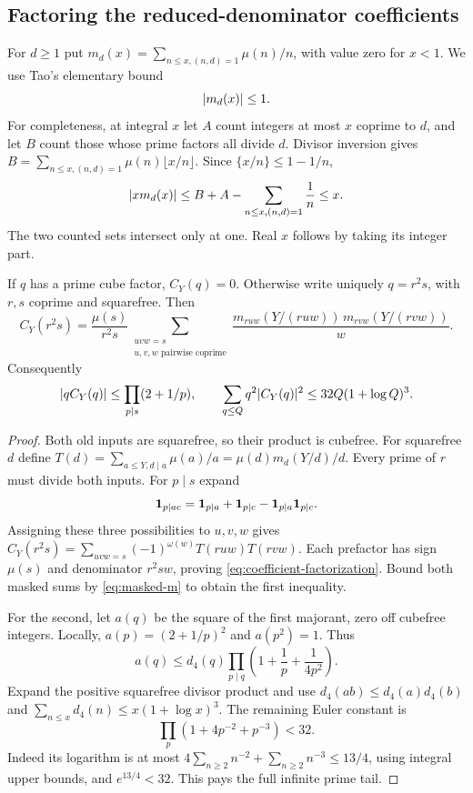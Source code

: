 \subsection{Factoring the reduced-denominator coefficients}
For $d\ge1$ put $m_d(x)=\sum_{n\le x,(n,d)=1}\mu(n)/n$, with value zero for $x<1$. We use Tao's elementary bound \cite{Tao10}
\begin{equation}\label{eq:masked-m}
 \lvert m_d(x)\rvert\le1.
\end{equation}
For completeness, at integral $x$ let $A$ count integers at most $x$ coprime to $d$, and let $B$ count those whose prime factors all divide $d$. Divisor inversion gives
$B=\sum_{n\le x,(n,d)=1}\mu(n)\lfloor x/n\rfloor$. Since $\{x/n\}\le1-1/n$,
\[
 \lvert xm_d(x)\rvert\le B+A-\sum_{n\le x,(n,d)=1}\frac1n\le x.
\]
The two counted sets intersect only at one. Real $x$ follows by taking its integer part.

\begin{proposition}\label{prop:denominator}
If $q$ has a prime cube factor, $C_Y(q)=0$. Otherwise write uniquely $q=r^2s$, with $r,s$ coprime and squarefree. Then
\begin{equation}\label{eq:coefficient-factorization}
 C_Y(r^2s)=\frac{\mu(s)}{r^2s}
 \sum_{\substack{uvw=s\\u,v,w\text{ pairwise coprime}}}
 \frac{m_{ruw}(Y/(ruw))\,m_{rvw}(Y/(rvw))}{w}.
\end{equation}
Consequently
\begin{equation}\label{eq:coefficient-bounds}
 \lvert qC_Y(q)\rvert\le\prod_{p\mid s}(2+1/p),\qquad
 \sum_{q\le Q}q^2\lvert C_Y(q)\rvert^2\le32Q(1+\log Q)^3.
\end{equation}
\end{proposition}
\begin{proof}
Both old inputs are squarefree, so their product is cubefree. For squarefree $d$ define
$T(d)=\sum_{a\le Y,d\mid a}\mu(a)/a=\mu(d)m_d(Y/d)/d$. Every prime of $r$ must divide both inputs. For $p\mid s$ expand
\[
 \mathbf 1_{p\mid ac}=\mathbf 1_{p\mid a}+\mathbf 1_{p\mid c}
                  -\mathbf 1_{p\mid a}\mathbf 1_{p\mid c}.
\]
Assigning these three possibilities to $u,v,w$ gives
$C_Y(r^2s)=\sum_{uvw=s}(-1)^{\omega(w)}T(ruw)T(rvw)$. Each prefactor has sign $\mu(s)$ and denominator $r^2sw$, proving \eqref{eq:coefficient-factorization}. Bound both masked sums by \eqref{eq:masked-m} to obtain the first inequality.

For the second, let $a(q)$ be the square of the first majorant, zero off cubefree integers. Locally, $a(p)=(2+1/p)^2$ and $a(p^2)=1$. Thus
\[
 a(q)\le d_4(q)\prod_{p\mid q}\left(1+\frac1p+\frac1{4p^2}\right).
\]
Expand the positive squarefree divisor product and use
$d_4(ab)\le d_4(a)d_4(b)$ and $\sum_{n\le x}d_4(n)\le x(1+\log x)^3$. The remaining Euler constant is
\[
 \prod_p(1+4p^{-2}+p^{-3})<32.
\]
Indeed its logarithm is at most $4\sum_{n\ge2}n^{-2}+\sum_{n\ge2}n^{-3}\le13/4$, using integral upper bounds, and $e^{13/4}<32$. This pays the full infinite prime tail.
\end{proof}

